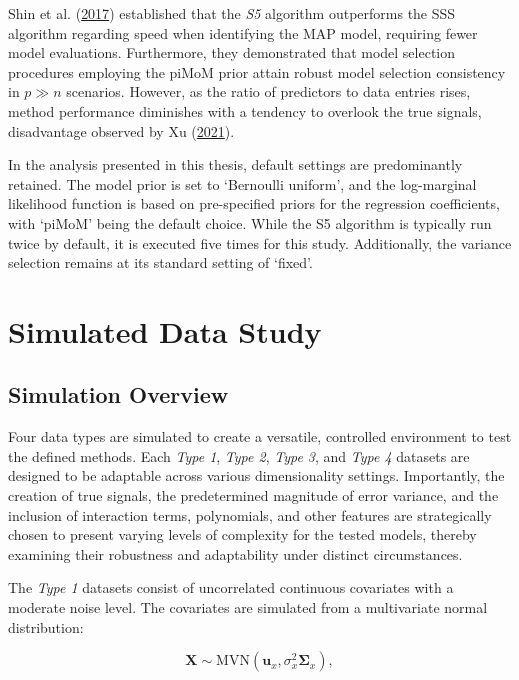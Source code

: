 \documentclass[
  11pt,
]{article}
\begin{document}
Shin et al. (\protect\hyperlink{ref-Shin2018}{2017}) established that
the \emph{S5} algorithm outperforms the SSS algorithm regarding speed
when identifying the MAP model, requiring fewer model evaluations.
Furthermore, they demonstrated that model selection procedures employing
the piMoM prior attain robust model selection consistency in \(p \gg n\)
scenarios. However, as the ratio of predictors to data entries rises,
method performance diminishes with a tendency to overlook the true
signals, disadvantage observed by Xu
(\protect\hyperlink{ref-Xu2021}{2021}).

In the analysis presented in this thesis, default settings are
predominantly retained. The model prior is set to `Bernoulli uniform',
and the log-marginal likelihood function is based on pre-specified
priors for the regression coefficients, with `piMoM' being the default
choice. While the S5 algorithm is typically run twice by default, it is
executed five times for this study. Additionally, the variance selection
remains at its standard setting of `fixed'.

\newpage

\section{Simulated Data Study}

\subsection{Simulation Overview}

Four data types are simulated to create a versatile, controlled
environment to test the defined methods. Each \emph{Type 1}, \emph{Type
2}, \emph{Type 3}, and \emph{Type 4} datasets are designed to be
adaptable across various dimensionality settings. Importantly, the
creation of true signals, the predetermined magnitude of error variance,
and the inclusion of interaction terms, polynomials, and other features
are strategically chosen to present varying levels of complexity for the
tested models, thereby examining their robustness and adaptability under
distinct circumstances.

\hfill\break

The \emph{Type 1} datasets consist of uncorrelated continuous covariates
with a moderate noise level. The covariates are simulated from a
multivariate normal distribution:

\begin{equation}
\mathbf{X} \sim \text{MVN}(\mathbf{u}_x, \sigma_x^2 \mathbf{\Sigma}_x),
\end{equation}
\end{document}
